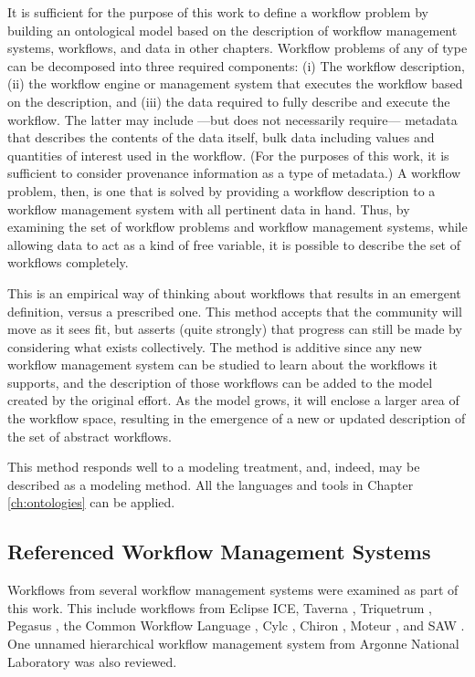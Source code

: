 It is sufficient for the purpose of this work to define a workflow problem
by building an ontological model based on the description of workflow
management systems, workflows, and data in other chapters. Workflow problems of
any of type can be decomposed into three required components: (i) The workflow
description, (ii) the workflow engine or management system that executes the
workflow based on the description, and (iii) the data required to fully describe
and execute the workflow. The latter may include ---but does not necessarily
require--- metadata that describes the contents of the data itself, bulk data
including values and quantities of interest used in the workflow. (For the purposes of
this work, it is sufficient to consider provenance information as a type of
metadata.) A workflow problem, then, is one that is solved by providing a
workflow description to a workflow management system with all pertinent data in
hand. Thus, by examining the set of workflow problems and workflow management
systems, while allowing data to act as a kind of free variable, it is possible
to describe the set of workflows completely.

This is an empirical way of thinking about workflows that results in an emergent
definition, versus a prescribed one. This method accepts that the community will
move as it sees fit, but asserts (quite strongly) that progress can still be
made by considering what exists collectively. The method is additive since
any new workflow management system can be studied to learn about the
workflows it supports, and the description of those workflows can be added to
the model created by the original effort. As the model grows, it will enclose a
larger area of the workflow space, resulting in the emergence of a new or
updated description of the set of abstract workflows.

This method responds well to a modeling treatment, and, indeed, may be described
as a modeling method. All the languages and tools in Chapter \ref{ch:ontologies}
can be applied.

\subsection{Referenced Workflow Management Systems}

Workflows from several workflow management systems were examined as part of this
work. This include workflows from Eclipse ICE, Taverna
\cite{wolstencroft_taverna_2013}, Triquetrum \cite{brooks_introducing_2016},
Pegasus \cite{noauthor_pegasus_nodate}, the Common Workflow Language
\cite{noauthor_common-workflow-language:_2018}, Cylc
\cite{j_oliver_cylc:_2018}, Chiron \cite{ ogasawara_chiron:_nodate}, Moteur
\cite{glatard_flexible_2008}, and SAW \cite{clay_incorporating_2015}. One
unnamed hierarchical workflow management system from Argonne National
Laboratory was also reviewed.


